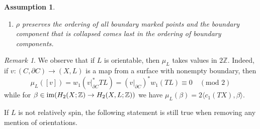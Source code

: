 \documentclass[11pt,psamsfonts, oneside, reqno]{amsart}
\newcommand{\cl}{\colon}
\newcommand{\lspan}[1]{\langle {#1}\rangle}
\newcommand{\im}{\normalfont\text{im}}
\newcommand{\del}{\partial}
\newcommand{\bZ}{\mathbb{Z}}
\newcommand{\evab}{evb}
\newtheorem{assum}[theorem]{Assumption}
\theoremstyle{definition}
\theoremstyle{remark}
\newtheorem{remark}[theorem]{Remark}
\numberwithin{equation}{section}
\begin{document}
\begin{assum}
\begin{enumerate}[ a),leftmargin=*]
\begin{enumerate}[ 1)]
\begin{enumerate}[ 1)]
	\item\label{ev-2-self-clutching-1} $j = 1$, i.e., $\evab_{b,j}$ is the evaluation at the first marked point on $b^{th}$ boundary component,
	\item\label{marked-points-self-clutching-1} the boundary marked points on the image of curves under $\psi^{(2)}$ are ordered as in the case of $\varphi$;
\end{enumerate} 
\end{enumerate}
\item\label{as:collapse} $\rho$ preserves the ordering of all boundary marked points and the boundary component that is collapsed comes last in the ordering of boundary components.
	\end{enumerate}
\end{assum} 

\begin{remark}\label{rem:maslov-index-if-orientable} We observe that if $L$ is orientable, then $\mu_L$ takes values in $2\bZ$. Indeed, if $v \cl (C,\del C)\to (X,L)$ is a map from a surface with nonempty boundary, then 
	$$\mu_L([v]) = w_1(v|_{\del C}^*TL) = (v|_{\del C})^*w_1(TL) \equiv 0 \quad (\text{mod }2)$$\noindent
	while for $\beta \in \im(H_2(X;\bZ)\to H_2(X,L;\bZ))$ we have $\mu_L(\beta) = 2\lspan{c_1(TX),\beta}$. 
\end{remark}

\noindent
If $L$ is not relatively spin, the following statement is still true when removing any mention of orientations.
\end{document}
